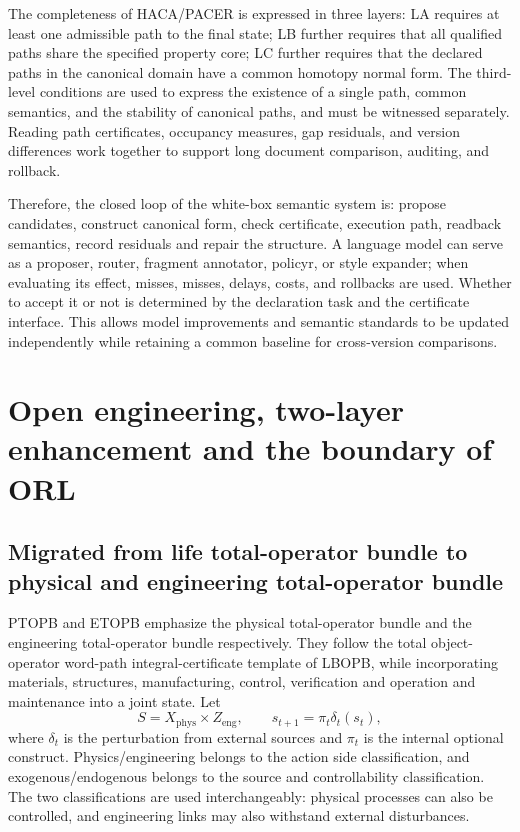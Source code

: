 \documentclass[11pt,a4paper]{article}
\theoremstyle{plain}
\theoremstyle{definition}
\theoremstyle{remark}
\begin{document}
\begin{CJK*}
The completeness of HACA/PACER is expressed in three layers: LA requires at least one admissible path to the final state; LB further requires that all qualified paths share the specified property core; LC further requires that the declared paths in the canonical domain have a common homotopy normal form. The third-level conditions are used to express the existence of a single path, common semantics, and the stability of canonical paths, and must be witnessed separately. Reading path certificates, occupancy measures, gap residuals, and version differences work together to support long document comparison, auditing, and rollback. \cite{S04}

Therefore, the closed loop of the white-box semantic system is: propose candidates, construct canonical form, check certificate, execution path, readback semantics, record residuals and repair the structure. A language model can serve as a proposer, router, fragment annotator, policyr, or style expander; when evaluating its effect, misses, misses, delays, costs, and rollbacks are used. Whether to accept it or not is determined by the declaration task and the certificate interface. This allows model improvements and semantic standards to be updated independently while retaining a common baseline for cross-version comparisons.

\section { Open engineering, two-layer enhancement and the boundary of ORL }\label{fa:openengineering}


\subsection { Migrated from life total-operator bundle to physical and engineering total-operator bundle }

PTOPB and ETOPB emphasize the physical total-operator bundle and the engineering total-operator bundle respectively. They follow the total object-operator word-path integral-certificate template of LBOPB, while incorporating materials, structures, manufacturing, control, verification and operation and maintenance into a joint state. Let \[
 S=X_{\mathrm{phys}}\times Z_{\mathrm{eng}},\qquad
 s_{t+1}=\pi_t\delta_t(s_t),
\] where $\delta_t$ is the perturbation from external sources and $\pi_t$ is the internal optional construct. Physics/engineering belongs to the action side classification, and exogenous/endogenous belongs to the source and controllability classification. The two classifications are used interchangeably: physical processes can also be controlled, and engineering links may also withstand external disturbances. \cite{S13,S14,S15}


\end{CJK*}
\end{document}
